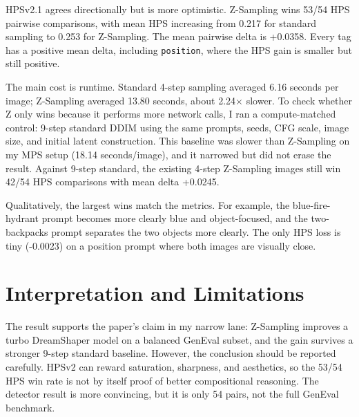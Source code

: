 HPSv2.1 agrees directionally but is more optimistic. Z-Sampling wins 53/54 HPS pairwise comparisons, with mean HPS increasing from 0.217 for standard sampling to 0.253 for Z-Sampling. The mean pairwise delta is +0.0358. Every tag has a positive mean delta, including \texttt{position}, where the HPS gain is smaller but still positive.

The main cost is runtime. Standard 4-step sampling averaged 6.16 seconds per image; Z-Sampling averaged 13.80 seconds, about 2.24$\times$ slower. To check whether Z only wins because it performs more network calls, I ran a compute-matched control: 9-step standard DDIM using the same prompts, seeds, CFG scale, image size, and initial latent construction. This baseline was slower than Z-Sampling on my MPS setup (18.14 seconds/image), and it narrowed but did not erase the result. Against 9-step standard, the existing 4-step Z-Sampling images still win 42/54 HPS comparisons with mean delta +0.0245.


Qualitatively, the largest wins match the metrics. For example, the blue-fire-hydrant prompt becomes more clearly blue and object-focused, and the two-backpacks prompt separates the two objects more clearly. The only HPS loss is tiny (-0.0023) on a position prompt where both images are visually close.

\section{Interpretation and Limitations}

The result supports the paper's claim in my narrow lane: Z-Sampling improves a turbo DreamShaper model on a balanced GenEval subset, and the gain survives a stronger 9-step standard baseline. However, the conclusion should be reported carefully. HPSv2 can reward saturation, sharpness, and aesthetics, so the 53/54 HPS win rate is not by itself proof of better compositional reasoning. The detector result is more convincing, but it is only 54 pairs, not the full GenEval benchmark.

